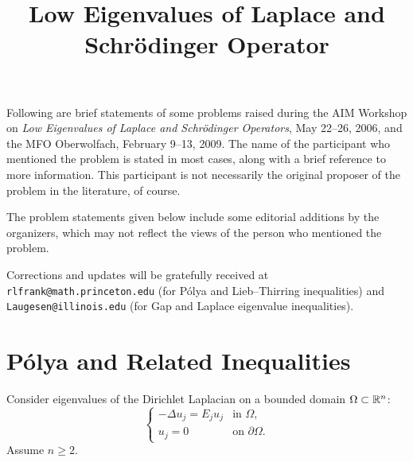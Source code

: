 \documentclass[12pt,letterpaper, reqno]{amsart}
\begin{document}
\title{Low Eigenvalues of Laplace and Schr\"{o}dinger Operator}

\maketitle

Following are brief statements of some problems raised during the
AIM Workshop on \emph{Low Eigenvalues of Laplace and Schr\"{o}dinger
Operators}, May 22--26, 2006, and the MFO Oberwolfach, February 9--13, 2009. The name of the participant who
mentioned the problem is stated in most cases, along with a brief
reference to more information. This participant is not necessarily
the original proposer of the problem in the literature, of course.

The problem statements given below include some editorial additions
by the organizers, which may not reflect the views of the person who
mentioned the problem.

Corrections and updates will be gratefully received at
\texttt{rlfrank@math.princeton.edu}
(for P\'olya and Lieb--Thirring inequalities)
 and \texttt{Laugesen@illinois.edu}
(for Gap and Laplace eigenvalue inequalities).


\section{ P\'{o}lya and Related Inequalities}

Consider eigenvalues of the Dirichlet Laplacian on a bounded domain
$\Omega \subset \mathbb R^n$:
\[
\begin{cases}
-\Delta u_j = E_j u_j & \text{in $\Omega$,} \\
u_j = 0 & \text{on $\partial \Omega$.}
\end{cases}
\]
Assume $n \geq 2$.
\end{document}
